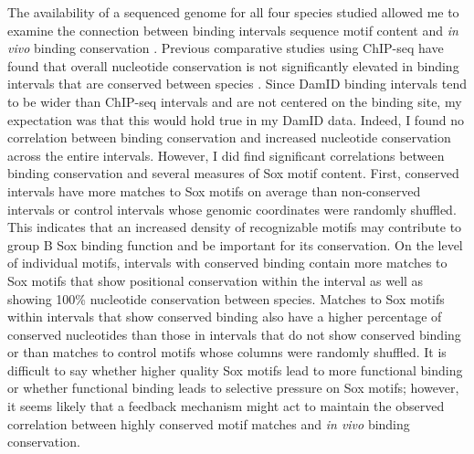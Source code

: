 The availability of a sequenced genome for all four species studied allowed me to examine the connection between binding intervals sequence motif content and \emph{in vivo} binding conservation \citep{clark_evolution_2007}. Previous comparative studies using ChIP-seq have found that overall nucleotide conservation is not significantly elevated in binding intervals that are conserved between species \citep{bradley_binding_2010,he_high_2011}. Since DamID binding intervals tend to be wider than ChIP-seq intervals and are not centered on the binding site, my expectation was that this would hold true in my DamID data. Indeed, I found no correlation between binding conservation and increased nucleotide conservation across the entire intervals. However, I did find significant correlations between binding conservation and several measures of Sox motif content. First, conserved intervals have more matches to Sox motifs on average than non-conserved intervals or control intervals whose genomic coordinates were randomly shuffled. This indicates that an increased density of recognizable motifs may contribute to group B Sox binding function and be important for its conservation. On the level of individual motifs, intervals with conserved binding contain more matches to Sox motifs that show positional conservation within the interval as well as showing 100\% nucleotide conservation between species. Matches to Sox motifs within intervals that show conserved binding also have a higher percentage of conserved nucleotides than those in intervals that do not show conserved binding or than matches to control motifs whose columns were randomly shuffled. It is difficult to say whether higher quality Sox motifs lead to more functional binding or whether functional binding leads to selective pressure on Sox motifs; however, it seems likely that a feedback mechanism might act to maintain the observed correlation between highly conserved motif matches and \emph{in vivo} binding conservation.

